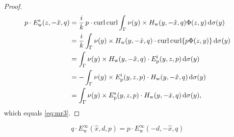 \begin{proof}
  \begin{align*}
    p\cdot E_\text{w}^\text{s}(z, -\hat{x}, q) &= \frac{i}{k}\,p\cdot\operatorname{curl}\operatorname{curl}\int_{\Gamma}\nu(y)\times H_\text{w}(y, -\hat{x}, q)\Phi(z, y)\,\text{d}\sigma(y) \\
    &=\frac{i}{k}\int_{\Gamma}\nu(y)\times H_\text{w}(y, -\hat{x}, q)\cdot\operatorname{curl}\operatorname{curl}\{p\Phi(z, y)\}\,\text{d}\sigma(y) \\
    &=\int_{\Gamma}\nu(y)\times H_\text{w}(y, -\hat{x}, q)\cdot E_\text{p}^\text{i}(y, z, p)\,\text{d}\sigma(y) \\
    &=-\int_{\Gamma}\nu(y)\times E_\text{p}^\text{i}(y, z, p)\cdot H_\text{w}(y, -\hat{x}, q)\,\text{d}\sigma(y) \\
    &=\int_{\Gamma}\nu(y)\times E_\text{p}^\text{s}(y, z, p)\cdot H_\text{w}(y, -\hat{x}, q)\,\text{d}\sigma(y),
   \end{align*}
   which equals \eqref{eq:mr3}.
\end{proof}

\begin{thm}
  $$q\cdot E_\text{w}^\infty(\hat{x}, d, p) = p\cdot E_\text{w}^\infty(-d, -\hat{x}, q)$$ 
\end{thm}

